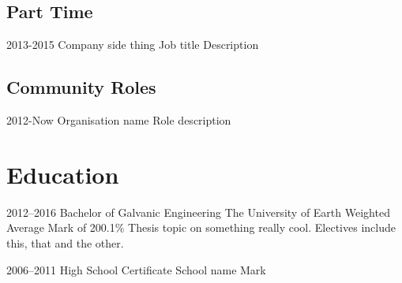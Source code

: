\documentclass[a4paper]{friggeri-cv} %
\begin{document}
\subsection{Part Time}

\begin{entrylist}


\entry
{2013-2015}
{Company}
{side thing}
{Job title}
{
Description
}




\end{entrylist}




\subsection{Community Roles}

\begin{entrylist}


\entry
{2012-Now}
{Organisation name}
{}
{Role}
{
description
}




\end{entrylist}


\section{Education}

\begin{entrylist}


\entry
{2012--2016}
{Bachelor {\normalfont of Galvanic Engineering}}
{The University of Earth}
{Weighted Average Mark of 200.1\%}
{
Thesis topic on something really cool. Electives include this, that and the other.
}


\entry
{2006--2011}
{High School Certificate}
{School name}
{Mark}
{
}


\end{entrylist}
\end{document}
